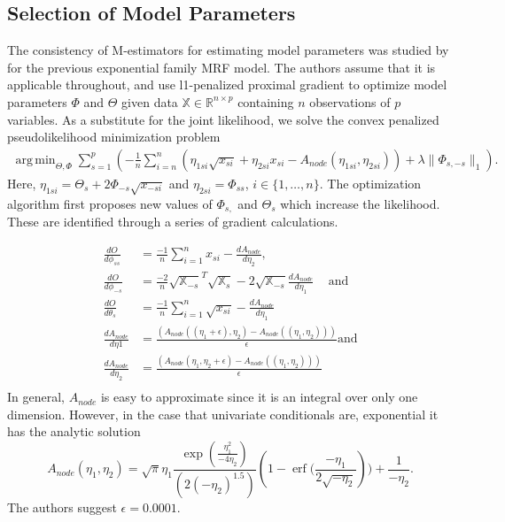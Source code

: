 \documentclass{samkoelleprelimworking}
\DeclareMathOperator\erf{erf}
\DeclareMathOperator*{\argmin}{arg\,min}
\begin{document}
\subsection{Selection of Model Parameters} \label{Optimization}

The consistency of M-estimators for estimating model parameters was studied by \citep{Yang2013-wa} for the previous exponential family MRF model.  The authors assume that it is applicable throughout, and use l1-penalized proximal gradient to optimize model parameters $\Phi$ and $\Theta$ given data $\mathbb{X} \in \mathbb{R}^{n\times p}$ containing $n$ observations of $p$ variables.  As a substitute for the joint likelihood, we solve the convex penalized pseudolikelihood minimization problem
\begin{align}
 \argmin_{\Theta, \Phi} \sum_{s = 1}^{p} (-\frac{1}{n} \sum_{i = n}^n (\eta_{1si} \sqrt{x_{si}} + \eta_{2si} x_{si} - A_{node} ( \eta_{1si}, \eta_{2si} )) + \lambda\| \Phi_{s,-s} \|_1).
 \end{align}
Here, $\eta_{1si} = \Theta_s + 2 \Phi_{-s}\sqrt{x_{-si}}$ and $\eta_{2si} = \Phi_{ss}$, $i \in \{1,\dotsc, n\}$.  The optimization algorithm first proposes new values of $\Phi_{s,}$ and $\Theta_s$ which increase the likelihood.  These are identified through a series of gradient calculations.  

\begin{align*}
\frac{dO}{d\phi_{ss}} &= \frac{-1}{n} \sum_{i=1}^{n} x_{si} - \frac{dA_{node}}{d\eta_2}, \\
\frac{dO}{d\phi_{-s}} &= \frac{-2}{n} \sqrt{\mathbb{X}_{-s}}^T \sqrt{\mathbb{X}_s} - 2 \sqrt{\mathbb{X}_{-s}} \frac{dA_{node}}{d\eta_1}\, \quad \text{and}  \\
\frac{dO}{d\theta_{s}} &= \frac{-1}{n} \sum_{i=1}^{n} \sqrt{x_{si}} - \frac{dA_{node}}{d\eta_1} \\
\frac{dA_{node}}{d\eta1} &= \frac{(A_{node}((\eta_1 + \epsilon), \eta_2) - A_{node}((\eta_1 , \eta_2)))}{\epsilon} \text{and} \\
\frac{dA_{node}}{d\eta_2} &= \frac{(A_{node}(\eta_1 , \eta_2+ \epsilon) - A_{node}((\eta_1 , \eta_2)))}{\epsilon} \\ 
\end{align*}
In general, $A_{node}$ is easy to approximate since it is an integral over only one dimension. However, in the case that univariate conditionals are, exponential it has the analytic solution
\[A_{node} (\eta_1, \eta_2) = \sqrt{\pi}  \eta_1 \frac{\exp{ ( \frac{\eta_1^2}{-4\eta_2} ) }} { (2(-\eta_2)^{1.5})} (1 - \erf{(\frac{-\eta_1}{2 \sqrt{ -\eta_2}}}))  + \frac{1}{-\eta_2}.\]
The authors suggest $\epsilon = 0.0001$.
\end{document}
